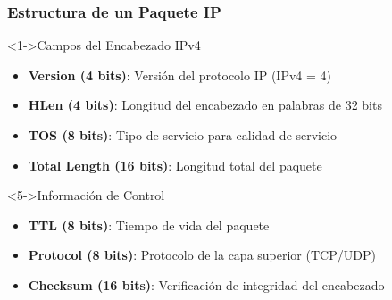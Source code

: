 \documentclass[aspectratio=169]{beamer}
\begin{document}
      \begin{frame}
      \frametitle{Estructura de un Paquete IP}
      \begin{block}<1->{Campos del Encabezado IPv4}
      \begin{itemize}
      \item<1-> \textbf{Version (4 bits)}: Versión del protocolo IP (IPv4 = 4)
      \item<2-> \textbf{HLen (4 bits)}: Longitud del encabezado en palabras de 32 bits
      \item<3-> \textbf{TOS (8 bits)}: Tipo de servicio para calidad de servicio
      \item<4-> \textbf{Total Length (16 bits)}: Longitud total del paquete
      \end{itemize}
      \end{block}
      
      \begin{block}<5->{Información de Control}
      \begin{itemize}
      \item<5-> \textbf{TTL (8 bits)}: Tiempo de vida del paquete
      \item<6-> \textbf{Protocol (8 bits)}: Protocolo de la capa superior (TCP/UDP)
      \item<7-> \textbf{Checksum (16 bits)}: Verificación de integridad del encabezado
      \end{itemize}
      \end{block}
      \end{frame}
      
\end{document}
